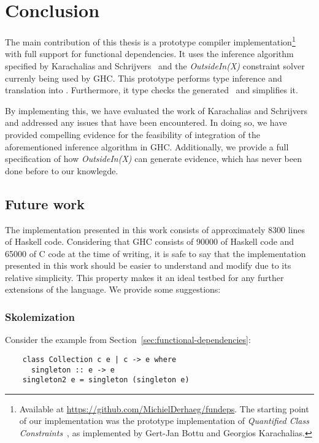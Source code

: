 \chapter{Conclusion}
\label{cha:conclusion}

The main contribution of this thesis is a prototype compiler
implementation\footnote{Available at
\url{https://github.com/MichielDerhaeg/fundeps}. The starting point of our
implementation was the prototype implementation of \emph{Quantified Class
Constraints}~\cite{quantcs}, as implemented by Gert-Jan Bottu and
Georgios Karachalias.} with full support for functional dependencies. It uses
the inference algorithm specified by Karachalias and
Schrijvers~\cite{Karachalias:2017:EFD:3156695.3122966} and the
\textit{OutsideIn(X)}\cite{outsideinx-modular-type-inference-with-local-assumptions}
constraint solver currenly being used by GHC.  This prototype performs type
inference and translation into \systemfc. Furthermore, it type checks the
generated \systemfc ~and simplifies it.

By implementing this, we have evaluated the work of Karachalias and
Schrijvers~\cite{Karachalias:2017:EFD:3156695.3122966} and addressed any issues
that have been encountered. In doing so, we have provided compelling evidence
for the feasibility of integration of the aforementioned inference algorithm in
GHC. Additionally, we provide a full specification of how \textit{OutsideIn(X)}
can generate evidence, which has never been done before to our knowlegde.

\section{Future work}

The implementation presented in this work consists of approximately 8300 lines
of Haskell code. Considering that GHC consists of 90000 of Haskell code and
65000 of C code at the time of writing, it is safe to say that the
implementation presented in this work should be easier to understand and modify
due to its relative simplicity. This property makes it an ideal testbed for
any further extensions of the language. We provide some suggestions:

\subsection{Skolemization}

Consider the example from Section~\ref{sec:functional-dependencies}:
\begin{verbatim}
    class Collection c e | c -> e where
      singleton :: e -> e
    singleton2 e = singleton (singleton e)
\end{verbatim}

